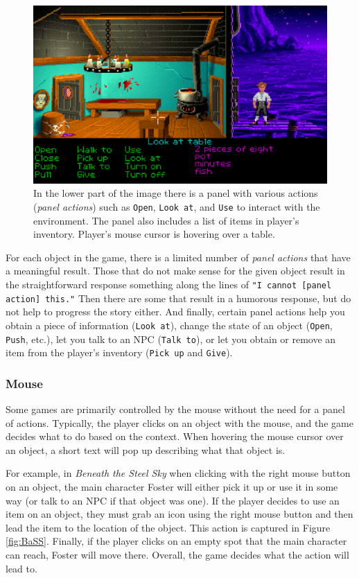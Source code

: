 \begin{figure}[H]
\centering
\includegraphics[width=.8\linewidth]{img/TSoMI.png}
\caption{In the lower part of the image there is a panel with various actions (\textit{panel actions}) such as \texttt{Open}, \texttt{Look at}, and \texttt{Use} to interact with the environment. The  panel also includes a list of items in player's inventory. Player's mouse cursor is hovering over a table.}
\label{fig:A-TSoMI}
\end{figure}

For each object in the game, there is a limited number of \textit{panel actions} that have a meaningful result. Those that do not make sense for the given object result in the straightforward response something along the lines of \texttt{"I cannot [panel action] this."} Then there are some that result in a humorous response, but do not help to progress the story either. And finally, certain panel actions help you obtain a piece of information (\texttt{Look at}), change the state of an object (\texttt{Open}, \texttt{Push}, etc.), let you talk to an NPC (\texttt{Talk to}), or let you obtain or remove an item from the player's inventory (\texttt{Pick up} and \texttt{Give}).

\subsubsection{Mouse}
Some games are primarily controlled by the mouse without the need for a panel of actions. Typically, the player clicks on an object with the mouse, and the game decides what to do based on the context. When hovering the mouse cursor over an object, a short text will pop up describing what that object is.

For example, in \textit{Beneath the Steel Sky} when clicking with the right mouse button on an object, the main character Foster will either pick it up or use it in some way (or talk to an NPC if that object was one). If the player decides to use an item on an object, they must grab an icon using the right mouse button and then lead the item to the location of the object. This action is captured in Figure \ref{fig:BaSS}. Finally, if the player clicks on an empty spot that the main character can reach, Foster will move there. Overall, the game decides what the action will lead to.


